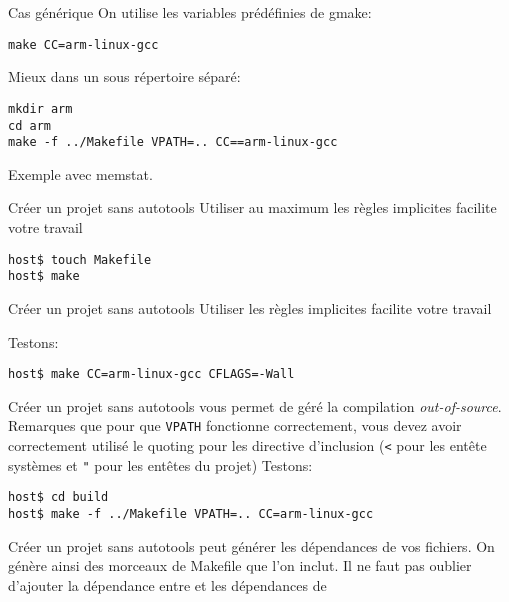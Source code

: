 \begin{frame}[fragile=singleslide]{Cas générique}
  On utilise les variables prédéfinies de gmake:
  \begin{lstlisting}
make CC=arm-linux-gcc
  \end{lstlisting}
  Mieux dans un sous répertoire séparé:
  \begin{lstlisting}
mkdir arm
cd arm
make -f ../Makefile VPATH=.. CC==arm-linux-gcc
  \end{lstlisting}
  Exemple avec memstat.
\end{frame}

\begin{frame}[fragile=singleslide]{Créer un projet sans autotools}
  Utiliser au maximum les règles implicites facilite votre travail
  \begin{lstlisting}
host$ touch Makefile
host$ make
  \end{lstlisting} %
\end{frame}

\begin{frame}[fragile=singleslide]{Créer un projet sans autotools}
  Utiliser les règles implicites facilite votre travail
  
  Testons:
\begin{lstlisting}
host$ make CC=arm-linux-gcc CFLAGS=-Wall
\end{lstlisting} %
\end{frame}

\begin{frame}[fragile=singleslide]{Créer un projet sans autotools}
   vous permet de géré la compilation \emph{out-of-source}.
  Remarques que pour que \verb+VPATH+ fonctionne correctement, vous devez avoir
  correctement utilisé le quoting pour les directive d'inclusion (\verb+<+ pour
  les entête systèmes et \verb+"+ pour les entêtes du projet)
  Testons:
\begin{lstlisting}
host$ cd build
host$ make -f ../Makefile VPATH=.. CC=arm-linux-gcc
\end{lstlisting} %
\end{frame}

\begin{frame}[fragile=singleslide]{Créer un projet sans autotools}
   peut  générer les dépendances de vos  fichiers.  On génère
  ainsi  des morceaux  de Makefile  que l'on  inclut. Il  ne  faut pas
  oublier   d'ajouter  la  dépendance   entre     et  les
  dépendances de 
  
\end{frame}

